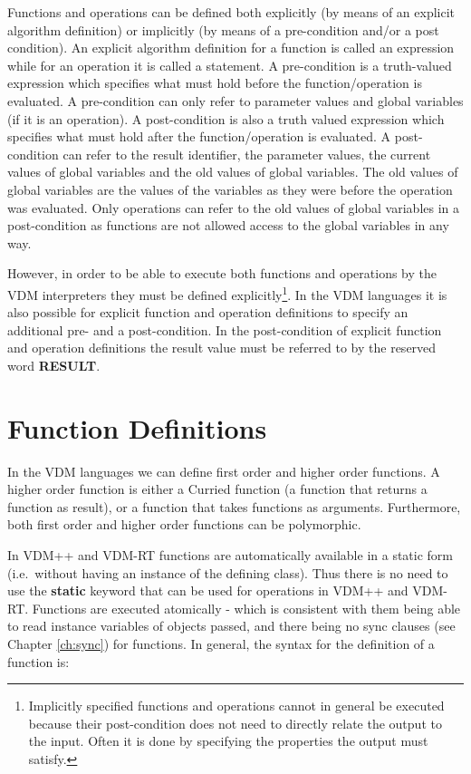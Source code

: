 \documentclass{overturerepchap}
\newcommand{\keyw}[1]{{\bf\ttfamily #1}}
\begin{document}
Functions and operations can be defined both explicitly (by means of
an explicit algorithm definition) or implicitly (by means of a
pre-condition and/or a post condition).  An explicit algorithm
definition for a function is called an expression while for an
operation it is called a statement.  A pre-condition is a truth-valued
expression which specifies what must hold before the
function/operation is evaluated. A pre-condition can only refer to
parameter values and global variables (if it is an operation).  A
post-condition is also a truth valued expression which specifies what
must hold after the function/operation is evaluated. A post-condition
can refer to the result identifier, the parameter values, the current
values of global variables and the old values of global variables. The
old values of global variables are the values of the variables as they
were before the operation was evaluated.  Only operations can refer to
the old values of global variables in a post-condition as functions
are not allowed access to the global variables in any way.

However, in order to be able to execute both functions and operations
by the VDM interpreters they must be defined explicitly\footnote{Implicitly
specified functions and operations cannot in general be executed
because their post-condition does not need to directly relate the
output to the input. Often it is done by specifying the properties the
output must satisfy.}. In the VDM languages it is also
possible for explicit function and operation definitions to specify an
additional pre- and a post-condition.  In the post-condition of
explicit function and operation definitions the result value must be
referred to by the reserved word \keyw{RESULT}.

\chapter{Function Definitions}\label{functiondef}

In the VDM languages we can define first order and higher order
functions. A higher order function is either a Curried function (a
function that returns a function as result), or a function that takes
functions as arguments. Furthermore, both first order and higher order
functions can be polymorphic.

In VDM++ and VDM-RT functions are automatically available in a static
form (i.e.\ without having an instance of the defining class). Thus
there is no need to use the {\bf\ttfamily static} keyword that can be
used for operations in VDM++ and VDM-RT. Functions are executed
atomically - which is consistent with them being able to read instance
variables of objects passed, and there being no sync clauses (see
Chapter \ref{ch:sync}) for functions. In general, the syntax for the
definition of a function is:
\end{document}
